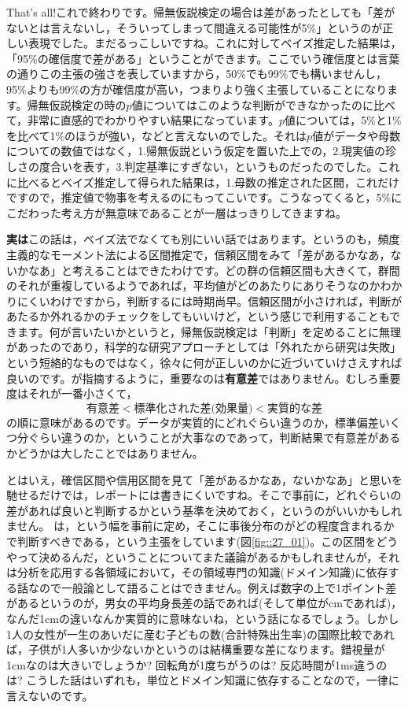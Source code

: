 \documentclass{ltjbook}
\begin{document}
That's all!これで終わりです。帰無仮説検定の場合は差があったとしても「差がないとは言えないし，そういってしまって間違える可能性が5\%」というのが正しい表現でした。まだるっこしいですね。これに対してベイズ推定した結果は，「95\%の確信度で差がある」ということができます。ここでいう確信度とは言葉の通りこの主張の強さを表していますから，50\%でも99\%でも構いませんし，95\%よりも99\%の方が確信度が高い，つまりより強く主張していることになります。帰無仮説検定の時の$p$値についてはこのような判断ができなかったのに比べて，非常に直感的でわかりやすい結果になっています。$p$値については，5\%と1\% を比べて1\%のほうが強い，などと言えないのでした。それは$p$値がデータや母数についての数値ではなく，1.帰無仮説という仮定を置いた上での，2.現実値の珍しさの度合いを表す，3.判定基準にすぎない，というものだったのでした。これに比べるとベイズ推定して得られた結果は，1.母数の推定された区間，これだけですので，推定値で物事を考えるのにもってこいです。こうなってくると，5\%にこだわった考え方が無意味であることが一層はっきりしてきますね。

\textbf{実は}この話は，ベイズ法でなくても別にいい話ではあります。というのも，頻度主義的なモーメント法による区間推定で，信頼区間をみて「差があるかなあ，ないかなあ」と考えることはできたわけです。どの群の信頼区間も大きくて，群間のそれが重複しているようであれば，平均値がどのあたりにありそうなのかわかりにくいわけですから，判断するには時期尚早。信頼区間が小さければ，判断があたるか外れるかのチェックをしてもいいけど，という感じで利用することもできます。何が言いたいかというと，帰無仮説検定は「判断」を定めることに無理があったのであり，科学的な研究アプローチとしては「外れたから研究は失敗」という短絡的なものではなく，徐々に何が正しいのかに近づいていけさえすれば良いのです。\citet{豊田秀樹2009}が指摘するように，重要なのは\textbf{有意差}ではありません。むしろ重要度はそれが一番小さくて，
\[ \mbox{有意差} < \mbox{標準化された差(効果量)} < \mbox{実質的な差} \]
の順に意味があるのです。データが実質的にどれぐらい違うのか，標準偏差いくつ分ぐらい違うのか，ということが大事なのであって，判断結果で有意差があるかどうかは大したことではありません。

とはいえ，確信区間や信用区間を見て「差があるかなあ，ないかなあ」と思いを馳せるだけでは，レポートには書きにくいですね。そこで事前に，どれぐらいの差があれば良いと判断するかという基準を決めておく，というのがいいかもしれません。
\citet{kruschke2018rejecting}は，という幅を事前に定め，そこに事後分布のがどの程度含まれるかで判断すべきである，という主張をしています(図\ref{fig::27_01})。この区間をどうやって決めるんだ，ということについてまた議論があるかもしれませんが，それは分析を応用する各領域において，その領域専門の知識(ドメイン知識)に依存する話なので一般論として語ることはできません。例えば数字の上で1ポイント差があるというのが，男女の平均身長差の話であれば(そして単位がcmであれば)，なんだ1cmの違いなんか実質的に意味ないね，という話になるでしょう。しかし1人の女性が一生のあいだに産む子どもの数(合計特殊出生率)の国際比較であれば，子供が1人多いか少ないかというのは結構重要な差になります。錯視量が1cmなのは大きいでしょうか? 回転角が1度ちがうのは? 反応時間が1ms違うのは? こうした話はいずれも，単位とドメイン知識に依存することなので，一律に言えないのです。
\end{document}
